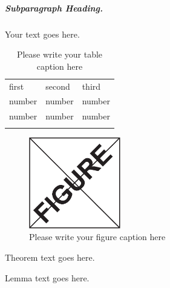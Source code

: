 \subparagraph{Subparagraph Heading.} Your text goes here.%
%
%
%
\begin{table}
\centering
\caption{Please write your table caption here}
\label{tab:1}       %
%
%
\begin{tabular}{lll}
\hline\noalign{\smallskip}
first & second & third  \\
\noalign{\smallskip}\hline\noalign{\smallskip}
number & number & number \\
number & number & number \\
\noalign{\smallskip}\hline
\end{tabular}
\end{table}
%
%
%
\begin{figure}
\centering
\includegraphics[height=4cm]{figure}
%
%
\caption{Please write your figure caption here}
\label{fig:1}       %
\end{figure}
%
%
\begin{theorem}
Theorem text goes here.
\end{theorem}
%
%
\begin{lemma}
Lemma text goes here.
\end{lemma}
%
%
